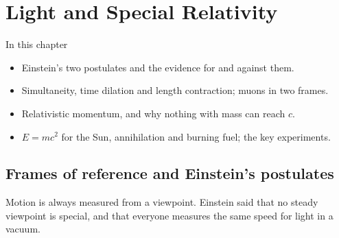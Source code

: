 \chapter{Light and Special Relativity}\label{ch4:chap}

\begin{summarybox}{In this chapter}
\begin{itemize}
  \item Einstein's two postulates and the evidence for and against them.
  \item Simultaneity, time dilation and length contraction; muons in two frames.
  \item Relativistic momentum, and why nothing with mass can reach $c$.
  \item $E = mc^2$ for the Sun, annihilation and burning fuel; the key experiments.
\end{itemize}
\end{summarybox}

\section{Frames of reference and Einstein's postulates}\label{ch4:sec:postulates}

\begin{bigidea}
Motion is always measured from a viewpoint. Einstein said that no steady viewpoint is special,
and that everyone measures the same speed for light in a vacuum.
\end{bigidea}

\begin{keywords}
\end{keywords}

